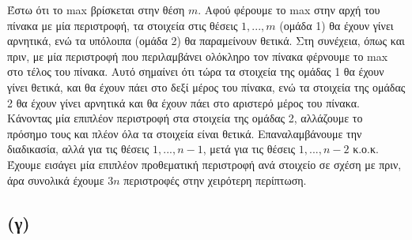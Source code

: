 			Έστω ότι το max βρίσκεται στην θέση $m$. Αφού φέρουμε το max στην αρχή του πίνακα με μία περιστροφή, τα στοιχεία στις θέσεις $1,..., m$ (ομάδα 1) θα έχουν γίνει αρνητικά, ενώ τα υπόλοιπα (ομάδα 2) θα παραμείνουν θετικά. Στη συνέχεια, όπως και πριν, με μία περιστροφή που περιλαμβάνει ολόκληρο τον πίνακα φέρνουμε το max στο τέλος του πίνακα. Αυτό σημαίνει ότι τώρα τα στοιχεία της ομάδας 1 θα έχουν γίνει θετικά, και θα έχουν πάει στο δεξί μέρος του πίνακα, ενώ τα στοιχεία της ομάδας 2 θα έχουν γίνει αρνητικά και θα έχουν πάει στο αριστερό μέρος του πίνακα. Κάνοντας μία επιπλέον περιστροφή στα στοιχεία της ομάδας 2, αλλάζουμε το πρόσημο τους και πλέον όλα τα στοιχεία είναι θετικά. Επαναλαμβάνουμε την διαδικασία, αλλά για τις θέσεις $1,...,n-1$, μετά για τις θέσεις $1,...,n-2$ κ.ο.κ. Έχουμε εισάγει μία επιπλέον προθεματική περιστροφή ανά στοιχείο σε σχέση με πριν, άρα συνολικά έχουμε $3n$ περιστροφές στην χειρότερη περίπτωση. 
			 	
		\subsection*{(γ)}

